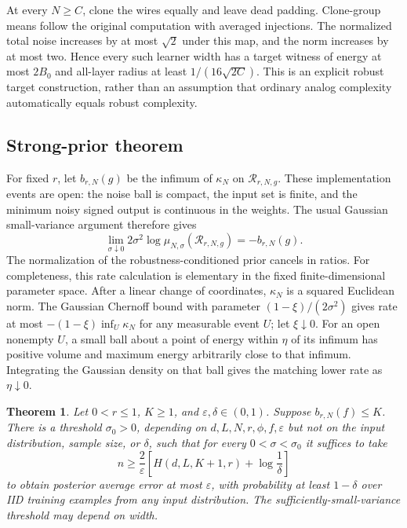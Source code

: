 \documentclass[11pt]{article}
\newtheorem{theorem}{Theorem}[section]
\begin{document}
At every $N\ge C$, clone the wires equally and leave dead padding.
Clone-group means follow the original computation with averaged injections.
The normalized total noise increases by at most $\sqrt2$ under this map,
and the norm increases by at most two. Hence every such learner width has
a target witness of energy at most $2B_0$ and all-layer radius at least
$1/(16\sqrt{2C})$. This is an explicit robust target construction, rather
than an assumption that ordinary analog complexity automatically equals
robust complexity.

\subsection{Strong-prior theorem}\label{sec:strong-limit}

For fixed $r$, let $b_{r,N}(g)$ be the infimum of $\kappa_N$ on
$\mathcal R_{r,N,g}$. These implementation events are open: the noise ball
is compact, the input set is finite, and the minimum noisy signed output
is continuous in the weights. The usual Gaussian small-variance argument
therefore gives
\[
 \lim_{\sigma\downarrow0}2\sigma^2\log
 \mu_{N,\sigma}(\mathcal R_{r,N,g})=-b_{r,N}(g).
\]
The normalization of the robustness-conditioned prior cancels in ratios.
For completeness, this rate calculation is elementary in the fixed
finite-dimensional parameter space. After a linear change of coordinates,
$\kappa_N$ is a squared Euclidean norm. The Gaussian Chernoff bound with
parameter $(1-\xi)/(2\sigma^2)$ gives rate at most
$-(1-\xi)\inf_U\kappa_N$ for any measurable event $U$; let $\xi\downarrow0$.
For an open nonempty $U$, a small ball about a point of energy within $\eta$
of its infimum has positive volume and maximum energy arbitrarily close
to that infimum. Integrating the Gaussian density on that ball gives the
matching lower rate as $\eta\downarrow0$.

\begin{theorem}\label{thm:strong}
Let $0<r\le1$, $K\ge1$, and $\varepsilon,\delta\in(0,1)$.
Suppose $b_{r,N}(f)\le K$. There is a threshold $\sigma_0>0$, depending on
$d,L,N,r,\phi,f,\varepsilon$ but not on the input distribution, sample size,
or $\delta$, such that for every $0<\sigma<\sigma_0$ it suffices to take
\[
 n\ge\frac2\varepsilon\left[H(d,L,K+1,r)+\log\frac1\delta\right]
\]
to obtain posterior average error at most $\varepsilon$, with probability
at least $1-\delta$ over IID training examples from any input distribution.
The sufficiently-small-variance threshold may depend on width.
\end{theorem}
\end{document}
